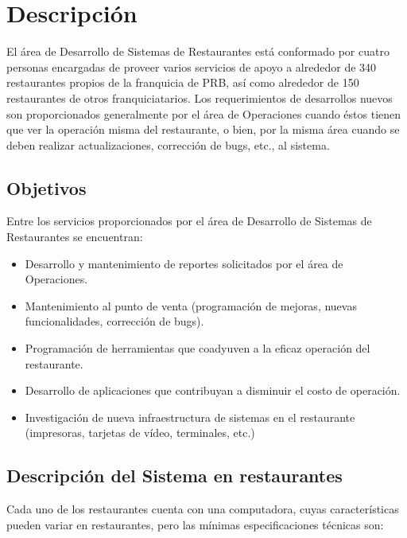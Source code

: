 
\chapter{Descripción}
\label{chap:descripcion}

El área de Desarrollo de Sistemas de Restaurantes está conformado por cuatro personas encargadas de proveer varios servicios de apoyo a alrededor de 340 restaurantes propios de la franquicia de PRB, así como alrededor de 150 restaurantes de otros franquiciatarios. Los requerimientos de desarrollos nuevos son proporcionados generalmente por el área de Operaciones cuando éstos tienen que ver la operación misma del restaurante, o bien, por la misma área cuando se deben realizar actualizaciones, corrección de bugs, etc., al sistema.

\section{Objetivos}
\label{sec:objetivos}

Entre los servicios proporcionados por el área de Desarrollo de Sistemas de Restaurantes se encuentran:

\begin{itemize}
 \item Desarrollo y mantenimiento de reportes solicitados por el área de Operaciones.
 \item Mantenimiento al punto de venta (programación de mejoras, nuevas funcionalidades, corrección de bugs).
 \item Programación de herramientas que coadyuven a la eficaz operación del restaurante.
 \item Desarrollo de aplicaciones que contribuyan a disminuir el costo de operación.
 \item Investigación de nueva infraestructura de sistemas en el restaurante (impresoras, tarjetas de vídeo, terminales, etc.)
\end{itemize}

\section{Descripción del Sistema en restaurantes}
\label{sec:descripcion}

Cada uno de los restaurantes cuenta con una computadora, cuyas características pueden variar en restaurantes, pero las mínimas especificaciones técnicas son:

